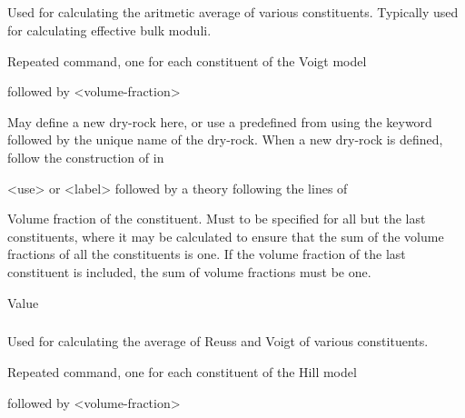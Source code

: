 {\subparagraph{}
 \slist
   \item \Description Used for calculating the aritmetic average of various constituents. Typically used for calculating effective bulk moduli. 
   \item \Argument
   \item \Default 
 \elist

 \slist
   \item \Description Repeated command, one for each constituent of the Voigt model
   \item {} followed by <volume-fraction>
   \item \Default
 \elist

 \slist
   \item \Description May define a new dry-rock here, or use a predefined  from  using the keyword  followed by the unique name of the dry-rock. When a new dry-rock is defined, follow the construction of  in 
   \item \Argument <use> or <label> followed by a theory following the lines of 
   \item \Default
 \elist

 \slist
   \item \Description Volume fraction of the constituent. Must to be specified for all but the last constituents, where it may be calculated to ensure that the sum of the volume fractions of all the constituents is one. If the volume fraction of the last constituent is included, the sum of volume fractions must be one. 
   \item \Argument Value
   \item \Default
 \elist

\subparagraph{}
 \slist
   \item \Description Used for calculating the average of Reuss and Voigt of various constituents.
   \item \Argument
   \item \Default 
 \elist

 \slist
   \item \Description Repeated command, one for each constituent of the Hill model
   \item {} followed by <volume-fraction>
   \item \Default
 \elist

}
